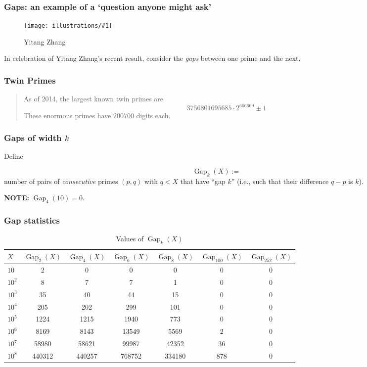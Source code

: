 \documentclass{beamer}
\DeclareMathOperator{\Gap}{Gap}
\newcommand{\ill}[3]{%
   \begin{figure}[H]%
   \vspace{-2ex}
   \centering%
   \texttt{[image: illustrations/\#1]}%
   \caption{#3}%
   \vspace{-2ex}
    \end{figure}}
\begin{document}
\begin{frame}\frametitle{\bf Gaps: an example of a `question anyone might ask'}
\vskip10pt

\ill{zhang}{0.15}{Yitang Zhang\label{fig:zhang}}

{\Huge
In celebration of Yitang Zhang's recent result, consider the {\em gaps} between one prime and the next.}
\end{frame}\begin{frame}\frametitle{\bf Twin Primes}
{\Huge
\begin{quote} As of 2014, the largest known twin primes are  \vskip10pt
$$3756801695685\cdot 2^{666669} \pm 1$$ \vskip10pt
These enormous primes have $200700$ digits each.
\end{quote}}
\end{frame}
\begin{frame}\frametitle{\bf Gaps of width $k$}
Define
{\Huge $$
  \Gap_{k}(X):=
$$
number of pairs of {\em consecutive} primes $(p,q)$ with
$q<X$ that have ``gap $k$'' (i.e., such that their difference $q-p$ is
$k$). 

\vskip20pt

{\bf NOTE:} $\Gap_{4}(10)=0$.}\end{frame}
\begin{frame}\frametitle{\bf Gap statistics}


\begin{table}[H]\centering
\caption{Values of $\Gap_{k}(X)$ \label{tab:gap}}
\vspace{1em}

{\small
\begin{tabular}{|l|c|c|c|c|c|c|}\hline
$X$ & $\Gap_{2}(X)$ & $\Gap_{4}(X)$& $\Gap_{6}(X)$ & $\Gap_{8}(X)$ &
 $\Gap_{100}(X)$ &   $\Gap_{252}(X)$\\\hline

$10$ & 2 & 0 & 0 & 0 & 0 & 0\\\hline
$10^{2}$ & 8 & 7 & 7 & 1 & 0 & 0\\\hline
$10^{3}$ & 35 & 40 & 44 & 15 & 0 & 0\\\hline
$10^{4}$ & 205 & 202 & 299 & 101 & 0 & 0\\\hline
$10^{5}$ & 1224 & 1215 & 1940 & 773 & 0 & 0\\\hline
$10^{6}$ & 8169 & 8143 & 13549 & 5569 & 2 & 0\\\hline
$10^{7}$ & 58980 & 58621 & 99987 & 42352 & 36 & 0\\\hline
$10^{8}$ & 440312 & 440257 & 768752 & 334180 & 878 & 0\\\hline

\end{tabular}
}
\end{table}
\end{frame}
\end{document}
